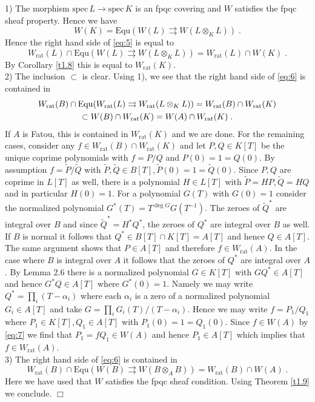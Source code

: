\documentclass[12pt,leqno]{article}
\newcommand{\tQ}{\tilde{Q}}
\newcommand{\spec}{\mathrm{spec}\,}
\newcommand{\Equ}{\mathrm{Equ}}
\newcommand{\rat}{\mathrm{rat}}
\newcommand{\tP}{\tilde{P}}
\newenvironment{proof}{\noindent {\bf Proof}}{\mbox{}\hspace*{\fill}$\Box$}
\begin{document}
\begin{proof}
1) The morphism $\spec L \to \spec K$ is an fpqc covering and $W$ satisfies the fpqc sheaf property. Hence we have 
\[
W (K) = \Equ (W (L) \rightrightarrows W (L \otimes_K L)) \; .
\]
Hence the right hand side of \eqref{eq:5} is equal to 
\[
W_{\rat} (L) \cap \Equ (W (L) \rightrightarrows W (L \otimes_K L)) = W_{\rat} (L) \cap W (K) \; .
\]
By Corollary \ref{t1.8} this is equal to $W_{\rat} (K)$.\\
2) The inclusion $\subset$ is clear. Using 1), we see that the right hand side of \eqref{eq:6} is contained in
\begin{gather} 
W_{\rat} (B) \cap \Equ (W_{\rat} (L) \rightrightarrows W_{\rat} (L \otimes_K L)) =  W_{\rat} (B) \cap W_{\rat} (K) \notag \\
\subset W (B) \cap W_{\rat} (K) = W (A) \cap W_{\rat} (K) \; . \label{eq:7}
\end{gather}
If $A$ is Fatou, this is contained in $W_{\rat} (K)$ and we are done. For the remaining cases, consider any $f \in W_{\rat} (B) \cap W_{\rat} (K)$ and let $P , Q \in K [T]$ be the unique coprime polynomials with $f = P / Q$ and $P (0) = 1 = Q (0)$. By assumption $f = \tP / \tQ$ with $\tP , \tQ \in B [T] , \tP (0) = 1 = \tQ (0)$. Since $P, Q$ are coprime in $L [T]$ as well, there is a polynomial $H \in L [T]$ with $\tP = HP , \tQ = HQ$ and in particular $H (0) = 1$. For a polynomial $G (T)$ with $G (0) = 1$ consider the normalized polynomial $G^* (T) = T^{\deg G} G (T^{-1})$. The zeroes of $\tQ^*$ are integral over $B$ and since $\tQ^* = H^* Q^*$, the zeroes of $Q^*$ are integral over $B$ as well. If $B$ is normal it follows that $Q^* \in B [T] \cap K [T] = A [T]$ and hence $Q \in A [T]$. The same argument shows that $P \in A [T]$ and therefore $f \in W_{\rat} (A)$. In the case where $B$ is integral over $A$ it follows that the zeroes of $Q^*$ are integral over $A$. By \cite{CC} Lemma 2.6 there is a normalized polynomial $G \in K [T]$ with $GQ^* \in A [T]$ and hence $G^* Q \in A [T]$ where $G^* (0) = 1$. Namely we may write $Q^* = \prod_i (T - \alpha_i)$ where each $\alpha_i$ is a zero of a normalized polynomial $G_i \in A [T]$ and take $G = \prod_i G_i (T) / (T - \alpha_i)$. Hence we may write $f = P_1 / Q_1$ where $P_1 \in K [T] , Q_1 \in A [T]$ with $P_1 (0) = 1 = Q_1 (0)$. Since $f \in W (A)$ by \eqref{eq:7} we find that $P_1 = fQ_1 \in W (A)$ and hence $P_1 \in A [T]$ which implies that $f \in W_{\rat} (A)$. \\
3) The right hand side of \eqref{eq:6} is contained in
\[
W_{\rat} (B) \cap \Equ (W (B) \rightrightarrows W (B \otimes_A B)) = W_{\rat} (B) \cap W (A) \; .
\]
Here we have used that $W$ satisfies the fpqc sheaf condition. Using Theorem \ref{t1.9} we conclude.
\end{proof}
%
\end{document}

